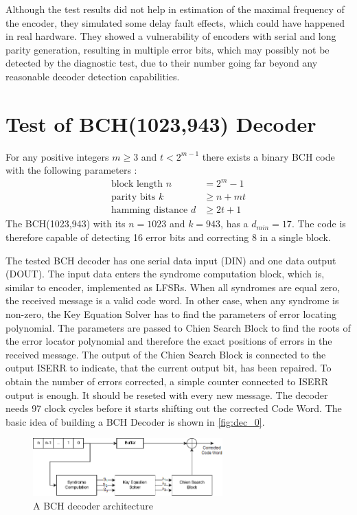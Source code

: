 Although the test results did not help in estimation of the maximal frequency of the encoder, they simulated some delay fault effects, which could have happened in real hardware. They showed a vulnerability of encoders with serial and long parity generation, resulting in multiple error bits, which may possibly not be detected by the diagnostic test, due to their number going far beyond any reasonable decoder detection capabilities.

\section{Test of BCH(1023,943) Decoder}
For any positive integers $m \geq 3$ and $t<2^{m-1}$ there exists a binary BCH code with the following parameters \cite{art:BCH_implement}:
\begin{subequations}
\begin{align}
    \text{block length }n&=2^{m}-1\label{eq:blck_len}\\
    \text{parity bits }k&\geq n+mt\label{eq:parity}\\
    \text{hamming distance }d&\geq2t+1\label{eq:dmin}
\end{align}
\end{subequations}
The BCH(1023,943) with its $n = 1023$ and $k=943$, has a $d_{min}= 17$. The code is therefore capable of detecting 16 error bits and correcting 8 in a single block. 

The tested BCH decoder has one serial data input (DIN) and one data output (DOUT). The input data enters the syndrome computation block, which is, similar to encoder, implemented as LFSRs. When all syndromes are equal zero, the received message is a valid code word. In other case, when any syndrome is non-zero, the Key Equation Solver has to find the parameters of error locating polynomial. The parameters are passed to Chien Search Block to find the roots of the error locator polynomial and therefore the exact positions of errors in the received message. The output of the Chien Search Block is connected to the output ISERR to indicate, that the current output bit, has been repaired. To obtain the number of errors corrected, a simple counter connected to ISERR output is enough. It should be reseted with every new message. The decoder needs 97 clock cycles before it starts shifting out the corrected Code Word. The basic idea of building a BCH Decoder is shown in \autoref{fig:dec_0}.

\begin{figure}[h]
\centering
\includegraphics[width=0.65\textwidth]{figures/BCH_DEC.png}
\caption{A BCH decoder architecture \cite{art:BCH_implement}}
\label{fig:dec_0}
\end{figure}


